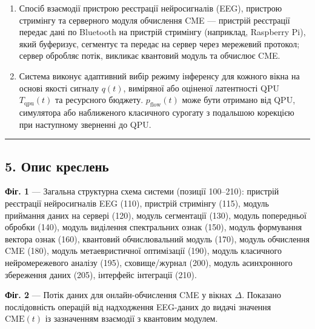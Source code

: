 \documentclass[12pt,a4paper]{article}
\begin{document}
\begin{enumerate}
\item

  Спосіб взаємодії пристрою реєстрації нейросигналів (EEG), пристрою стримінгу та серверного модуля обчислення CME --- пристрій реєстрації передає дані по Bluetooth на пристрій стримінгу (наприклад, Raspberry Pi), який буферизує, сегментує та передає на сервер через мережевий протокол; сервер обробляє потік, викликає квантовий модуль та обчислює CME.

\item

  Система виконує адаптивний вибір режиму інференсу для кожного вікна на основі якості сигналу \(q(t)\), виміряної або оціненої латентності QPU \(T_{\text{qpu}}(t)\) та ресурсного бюджету. \(p_{\text{flow}}(t)\) може бути отримано від QPU, симулятора або наближеного класичного сурогату з подальшою корекцією при наступному зверненні до QPU.

\end{enumerate}



\begin{center}\rule{0.5\linewidth}{0.5pt}\end{center}



\subsection{5. Опис креслень}\label{ux43eux43fux438ux441-ux43aux440ux435ux441ux43bux435ux43dux44c}



\textbf{Фіг. 1} --- Загальна структурна схема системи (позиції 100--210): пристрій реєстрації нейросигналів EEG (110), пристрій стримінгу (115), модуль приймання даних на сервері (120), модуль сегментації (130), модуль попередньої обробки (140), модуль виділення спектральних ознак (150), модуль формування вектора ознак (160), квантовий обчислювальний модуль (170), модуль обчислення CME (180), модуль метаевристичної оптимізації (190), модуль класичного нейромережевого аналізу (195), сховище/журнал (200), модуль асинхронного збереження даних (205), інтерфейс інтеграції (210).



\textbf{Фіг. 2} --- Потік даних для онлайн-обчислення CME у вікнах \(\Delta\). Показано послідовність операцій від надходження EEG-даних до видачі значення \(\text{CME}(t)\) із зазначенням взаємодії з квантовим модулем.
\end{document}

